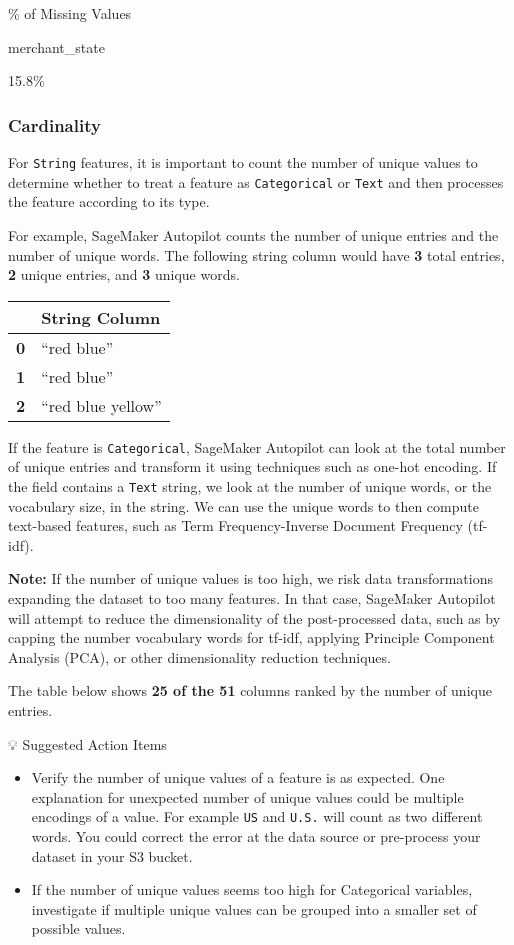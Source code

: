 \documentclass[11pt]{article}
\providecommand{\tightlist}{%
      \setlength{\itemsep}{0pt}\setlength{\parskip}{0pt}}
\begin{document}
\% of Missing Values

merchant\_state

15.8\%

    \hypertarget{cardinality}{%
\subsubsection{Cardinality}\label{cardinality}}

For \texttt{String} features, it is important to count the number of
unique values to determine whether to treat a feature as
\texttt{Categorical} or \texttt{Text} and then processes the feature
according to its type.

For example, SageMaker Autopilot counts the number of unique entries and
the number of unique words. The following string column would have
\textbf{3} total entries, \textbf{2} unique entries, and \textbf{3}
unique words.

\begin{longtable}[]{@{}ll@{}}
\toprule
& String Column\tabularnewline
\midrule
\endhead
\textbf{0} & ``red blue''\tabularnewline
\textbf{1} & ``red blue''\tabularnewline
\textbf{2} & ``red blue yellow''\tabularnewline
\bottomrule
\end{longtable}

If the feature is \texttt{Categorical}, SageMaker Autopilot can look at
the total number of unique entries and transform it using techniques
such as one-hot encoding. If the field contains a \texttt{Text} string,
we look at the number of unique words, or the vocabulary size, in the
string. We can use the unique words to then compute text-based features,
such as Term Frequency-Inverse Document Frequency (tf-idf).

\textbf{Note:} If the number of unique values is too high, we risk data
transformations expanding the dataset to too many features. In that
case, SageMaker Autopilot will attempt to reduce the dimensionality of
the post-processed data, such as by capping the number vocabulary words
for tf-idf, applying Principle Component Analysis (PCA), or other
dimensionality reduction techniques.

The table below shows \textbf{25 of the 51} columns ranked by the number
of unique entries.

💡 Suggested Action Items

\begin{itemize}
\tightlist
\item
  Verify the number of unique values of a feature is as expected. One
  explanation for unexpected number of unique values could be multiple
  encodings of a value. For example \texttt{US} and \texttt{U.S.} will
  count as two different words. You could correct the error at the data
  source or pre-process your dataset in your S3 bucket.
\item
  If the number of unique values seems too high for Categorical
  variables, investigate if multiple unique values can be grouped into a
  smaller set of possible values.
\end{itemize}
\end{document}
